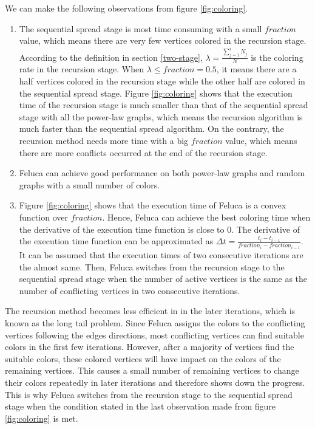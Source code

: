 We can make the following observations from figure \ref{fig:coloring}.
\begin{enumerate}
	\item The sequential spread stage is most time consuming with a small $fraction$ value, which means there are very few vertices colored in the recursion stage. According to the definition in section \ref{two-stage}, $\lambda = \frac{\sum_{j=1}^i{N_j}}{N}$ is the coloring rate in the recursion stage. When $\lambda \leq fraction =0.5$, it means there are a half vertices colored in the recursion stage while the other half are colored in the sequential spread stage. Figure \ref{fig:coloring} shows that the execution time of the recursion stage is much smaller than that of the sequential spread stage with all the power-law graphs, which means the recursion algorithm is much faster than the sequential spread algorithm. On the contrary, the recursion method needs more time with a big $fraction$ value, which means there are more conflicts occurred at the end of the  recursion stage.
	\item Feluca can achieve good performance on both power-law graphs and random graphs with a small number of colors.	
	\item Figure \ref{fig:coloring} shows that the execution time of Feluca is a convex function over $fraction$. Hence, Feluca can achieve the best coloring time when the derivative of the execution time function is close to 0. The derivative of the execution time function can be approximated as $\Delta t = \frac{t_i - t_{i-1}}{fraction_i - fraction_{i-1}}$. It can be assumed that the execution times of two consecutive iterations are the almost same. Then, Feluca switches from the recursion stage to the sequential spread stage when the number of active vertices is the same as the number of conflicting vertices in two consecutive iterations. 
\end{enumerate}

The recursion method becomes less efficient in in the later iterations, which is known as the long tail problem. Since Feluca assigns the colors to the conflicting vertices following the edges directions, most conflicting vertices can find suitable colors in the first few iterations. However, after a majority of vertices find the suitable colors, these colored vertices will have impact on the colors of the remaining vertices. This causes a small number of remaining vertices to change their colors repeatedly in later iterations and therefore shows down the progress. This is why Feluca switches from the recursion stage to the sequential spread stage when the condition stated in the last observation made from figure \ref{fig:coloring} is met.

